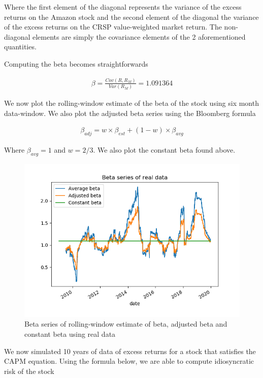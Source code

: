 \documentclass[10pt]{article}
\newenvironment{exercise}[2][Exercise]{\begin{trivlist}
  \item[\hskip \labelsep {\bfseries #1}\hskip \labelsep {\bfseries #2.}]}{\end{trivlist}}
\begin{document}
\begin{exercise}{2}
	Where the first element of the diagonal represents the variance of the excess returns on the Amazon stock and the second element of the diagonal the variance of the excess returns on the CRSP value-weighted market return. The non-diagonal elements are simply the covariance elements of the 2 aforementioned quantities. 	
	
	\smallbreak
	
	Computing the beta becomes straightforwards
	
	\begin{align*}
		\beta = \frac{Cov(R, R_{M})}{Var(R_{M})} = 1.091364
	\end{align*}

	We now plot the rolling-window estimate of the beta of the stock using six month data-window. We also plot the adjusted beta series using the Bloomberg formula 
	
	\begin{align*}
		\beta_{adj} = w \times \beta_{est} + (1 - w) \times \beta_{avg}
	\end{align*}
	
	Where $\beta_{avg} = 1 $ and $w = 2/3$. We also plot the constant beta found above.
	
	\begin{figure}[H]
	
		\centering
		\includegraphics[scale=0.8]{figures/ex2_2.png}	
		\caption{Beta series of rolling-window estimate of beta, adjusted beta and constant beta using real data}	
		\label{fig:ex2_2}
				
	\end{figure}	

	We now simulated 10 years of data of excess returns for a stock that satisfies the CAPM equation. Using the formula below, we are able to compute idiosyncratic risk of the stock
	

\end{exercise}
\end{document}
